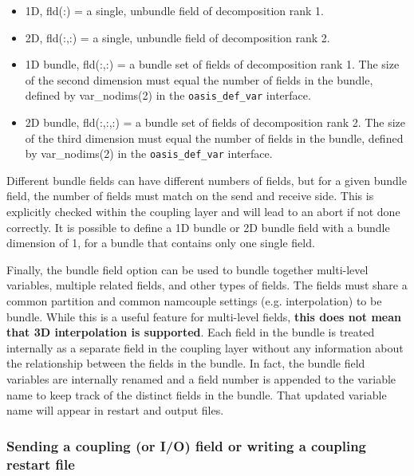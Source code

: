 \begin{itemize}
\item 1D, fld(:) = a single, unbundle field of decomposition rank 1.
\item 2D, fld(:,:) = a single, unbundle field of decomposition rank 2.
\item 1D bundle, fld(:,:) = a bundle set of fields of decomposition rank 1.
  The size of the second dimension must equal the number of fields in the 
  bundle, defined by var\_nodims(2) in the {\tt oasis\_def\_var} interface.
\item 2D bundle, fld(:,:,:) = a bundle set of fields of decomposition rank 2.
  The size of the third dimension must equal the number of fields in the 
  bundle, defined by var\_nodims(2) in the {\tt oasis\_def\_var} interface.
\end{itemize}

Different bundle fields
can have different numbers of fields, but for a given bundle field, the
number of fields must match on the send and receive side.  This is explicitly
checked within the coupling layer and will lead to an abort if not done correctly.
It is possible to define a 1D bundle or 2D bundle field  with a bundle dimension of 1, for a bundle that contains only one single field.

Finally, the bundle field option can be used to
bundle together multi-level variables, multiple related fields, and other types
of fields.  The fields must share a common partition and common namcouple settings (e.g. interpolation)
to be bundle.  While this is a useful feature for multi-level fields, {\bf this does not mean
that 3D interpolation is supported}.
Each field in the bundle is
treated internally as a separate field in the coupling layer without
any information about the relationship between the fields in the bundle.  In fact,
the bundle field variables are internally renamed and a field number is appended
to the variable name to keep track of the distinct fields in the bundle.  That
updated variable name will appear in restart and output files.


\subsubsection{Sending a coupling (or I/O) field or writing a coupling restart file}
\label{prismput}

